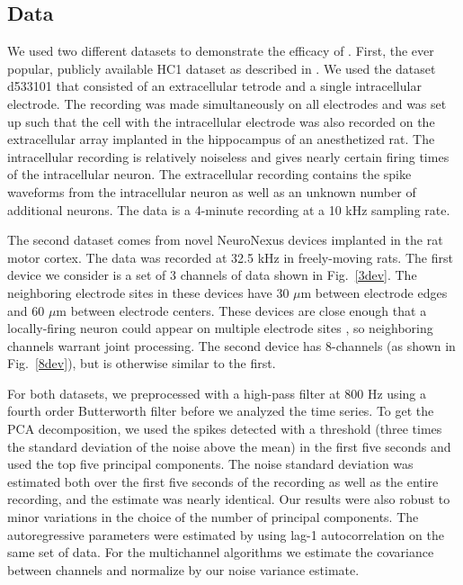 
\subsection{Data}

We used two different datasets to demonstrate the efficacy of \smug.  First, the ever popular, publicly available HC1 dataset %
as described in \cite{Henze2000}.  We used the dataset d533101 that consisted of an extracellular tetrode and a single intracellular electrode.  The recording was made simultaneously on all electrodes and was set up such that the cell with the intracellular electrode was also recorded on the extracellular array implanted in the hippocampus of an anesthetized rat. The intracellular recording is relatively noiseless and gives nearly certain firing times of the intracellular neuron.  The extracellular recording contains the spike waveforms from the intracellular neuron as well as an unknown number of additional neurons.  The data is a 4-minute recording at a 10 kHz sampling rate.  

The second dataset comes from novel NeuroNexus devices implanted in the rat motor cortex.  The data was recorded at 32.5 kHz in freely-moving rats.  The first device we consider is a set of 3 channels of data shown in Fig.\ \ref{3dev}.  The neighboring electrode sites in these devices have 30 $\mu$m between electrode edges and 60 $\mu$m between electrode centers.  These devices are close enough that a locally-firing neuron could appear on multiple electrode sites \cite{Prentice2011}, so neighboring channels warrant joint processing.  The second device has 8-channels (as shown in Fig.\ \ref{8dev}), but is otherwise similar to the first.

For both datasets, we preprocessed with a high-pass filter at 800 Hz using a fourth order Butterworth filter before we analyzed the time series.  To get the PCA decomposition, we used the spikes detected with a threshold (three times the standard deviation of the noise above the mean) in the first five seconds and used the top five principal components.  The noise standard deviation was estimated both over the first five seconds of the recording as well as the entire recording, and the estimate was nearly identical.  Our results were also robust to minor variations in the choice of the number of principal components.  The autoregressive parameters were estimated by using lag-1 autocorrelation on the same set of data.  For the multichannel algorithms we estimate the covariance between channels and normalize by our noise variance estimate.

